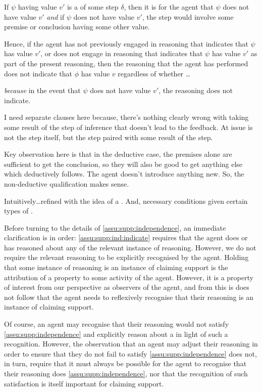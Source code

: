 \begin{note}
  If \(\psi\) having value \(v'\) is a \requ{} of some step \(\delta\), then it is \ep{} for the agent that \(\psi\) does not have value \(v'\) \emph{and} if \(\psi\) does not have value \(v'\), the step would involve some premise or conclusion having some other value.

  Hence, if the agent has not previously engaged in reasoning that indicates that \(\psi\) has value \(v'\), or does not engage in reasoning that indicates that \(\psi\) has value \(v'\) as part of the present reasoning, then the reasoning that the agent has performed does not indicate that \(\phi\) has value \(v\) regardless of whether \dots

  \emph{because} in the event that \(\psi\) does not have value \(v'\), the reasoning does not indicate.
\end{note}



\begin{note}
  {
    \color{red}
    I need separate clauses here because, there's nothing clearly wrong with taking some result of the step of inference that doesn't lead to the feedback.
    At issue is not the step itself, but the step paired with some result of the step.
  }

  {
    \color{red}
    Key observation here is that in the deductive case, the premises alone are sufficient to get the conclusion, so they will also be good to get anything else which deductively follows.
    The agent doesn't introduce anything new.
    So, the non-deductive qualification makes sense.
  }


  Intuitively\dots refined \ideaCSB{} with the idea of a \requ{}.
  And, necessary conditions given certain types of \requ{}.
\end{note}

\begin{note}
  Before turning to the details of \autoref{assu:supp:independence}, an immediate clarification is in order:
  \ref{assu:supp:ind:indicate} requires that the agent does or has reasoned about any  of the relevant instance of reasoning.
  However, we do not require the relevant reasoning to be explicitly recognised by the agent.
  Holding that some instance of reasoning is an instance of claiming support is the attribution of a property to some activity of the agent.
  However, it is a property of interest from our perspective as observers of the agent, and from this is does not follow that the agent needs to reflexively recognise that their reasoning is an instance of claiming support.

  Of course, an agent may recognise that their reasoning would not satisfy \autoref{assu:supp:independence} and explicitly reason about a  in light of such a recognition.
  However, the observation that an agent may adjust their reasoning in order to ensure that they do not fail to satisfy \autoref{assu:supp:independence} does not, in turn, require that it must always be possible for the agent to recognise that their reasoning does \autoref{assu:supp:independence}, nor that the recognition of such satisfaction is itself important for claiming support.
\end{note}

